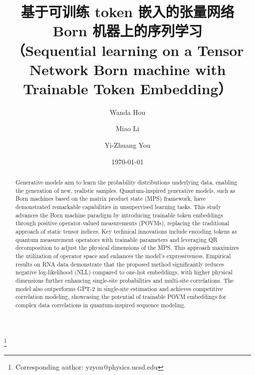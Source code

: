 
\setlength{\parindent}{2em}
\renewcommand{\refname}{参考文献}
\renewcommand{\figurename}{图}
\renewcommand{\tablename}{表}
\renewcommand{\acknowledgmentsname}{致谢}

\title{基于可训练 token 嵌入的张量网络 Born 机器上的序列学习\\
（Sequential learning on a Tensor Network Born machine with Trainable Token Embedding）}

\author{Wanda Hou}
\author{Miao Li}
\author{Yi-Zhuang You}
\thanks{Corresponding author: yzyou@physics.ucsd.edu}
\date{\today}

\begin{abstract}
 Generative models aim to learn the probability distributions underlying data, enabling the generation of new, realistic samples. Quantum-inspired generative models, such as Born machines based on the matrix product state (MPS) framework, have demonstrated remarkable capabilities in unsupervised learning tasks. This study advances the Born machine paradigm by introducing trainable token embeddings through positive operator-valued measurements (POVMs), replacing the traditional approach of static tensor indices. Key technical innovations include encoding tokens as quantum measurement operators with trainable parameters and leveraging QR decomposition to adjust the physical dimensions of the MPS. This approach maximizes the utilization of operator space and enhances the model’s expressiveness. Empirical results on RNA data demonstrate that the proposed method significantly reduces negative log-likelihood (NLL) compared to one-hot embeddings, with higher physical dimensions further enhancing single-site probabilities and multi-site correlations. The model also outperforms GPT-2 in single-site estimation and achieves competitive correlation modeling, showcasing the potential of trainable POVM embeddings for complex data correlations in quantum-inspired sequence modeling.
\end{abstract}

\maketitle

